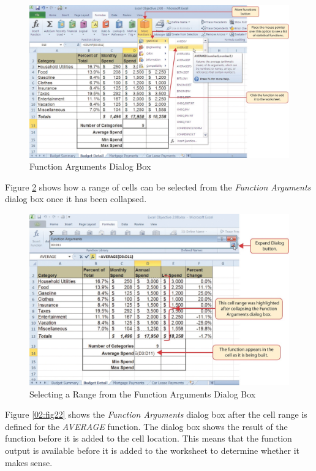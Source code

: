\begin{figure}[H]
	\centering
	\includegraphics[width=\maxwidth{.95\linewidth}]{gfx/ch02_fig20}
	\caption{Function Arguments Dialog Box}
	\label{02:fig20}
\end{figure}

Figure \ref{02:fig21} shows how a range of cells can be selected from the \textit{Function Arguments} dialog box once it has been collapsed.

\begin{figure}[H]
	\centering
	\includegraphics[width=\maxwidth{.95\linewidth}]{gfx/ch02_fig21}
	\caption{Selecting a Range from the Function Arguments Dialog Box}
	\label{02:fig21}
\end{figure}

Figure \ref{02:fig22} shows the \textit{Function Arguments} dialog box after the cell range is defined for the \textit{AVERAGE} function. The dialog box shows the result of the function before it is added to the cell location. This means that the function output is available before it is added to the worksheet to determine whether it makes sense.

